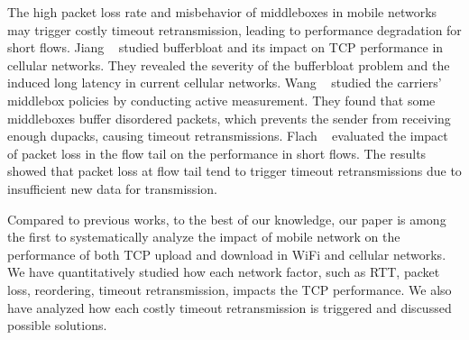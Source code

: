 The high packet loss rate and misbehavior of middleboxes in mobile networks may trigger costly timeout retransmission, leading to performance degradation for short flows. Jiang \etal~\cite{jiang2012tackling} studied bufferbloat and its impact on TCP performance in cellular networks. They revealed the severity of the bufferbloat problem and the induced long latency in current cellular networks. Wang \etal~\cite{Wang:2011:USM:2018436.2018479} studied the carriers' middlebox policies by conducting active measurement. They found that some middleboxes buffer disordered packets, which prevents the sender from receiving enough dupacks, causing timeout retransmissions. Flach \etal~\cite{flach2013reducing} evaluated the impact of packet loss in the flow tail on the performance in short flows. The results showed that packet loss at flow tail tend to trigger timeout retransmissions due to insufficient new data for transmission.

Compared to previous works, to the best of our knowledge, our paper is among the first to systematically analyze the impact of mobile network on the performance of both TCP upload and download in WiFi and cellular networks. We have quantitatively studied how each network factor, such as RTT, packet loss, reordering, timeout retransmission, impacts the TCP performance. We also have analyzed how each costly timeout retransmission is triggered and discussed possible solutions.
